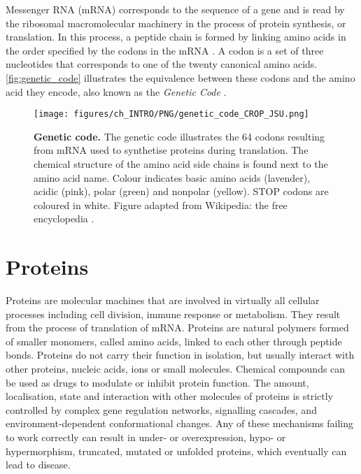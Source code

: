 Messenger RNA (mRNA) corresponds to the sequence of a gene and is read by the ribosomal macromolecular machinery in the process of protein synthesis, or translation. In this process, a peptide chain is formed by linking amino acids in the order specified by the codons in the mRNA \cite{CRICK_1957_CODE}. A codon is a set of three nucleotides that corresponds to one of the twenty canonical amino acids. \autoref{fig:genetic_code} illustrates the equivalence between these codons and the amino acid they encode, also known as the \textit{Genetic Code} \cite{GAMOW_1954_CODE}.

\begin{figure}[htb!]
    \centering
    \texttt{[image: figures/ch\_INTRO/PNG/genetic\_code\_CROP\_JSU.png]}
    \caption[Genetic code]{\textbf{Genetic code.} The genetic code illustrates the 64 codons resulting from mRNA used to synthetise proteins during translation. The chemical structure of the amino acid side chains is found next to the amino acid name. Colour indicates basic amino acids (lavender), acidic (pink), polar (green) and nonpolar (yellow). STOP codons are coloured in white. Figure adapted from Wikipedia: the free encyclopedia \cite{genetic_code_image}.}
    \label{fig:genetic_code}
\end{figure}

\section{Proteins}

Proteins are molecular machines that are involved in virtually all cellular processes including cell division, immune response or metabolism. They result from the process of translation of mRNA. Proteins are natural polymers formed of smaller monomers, called amino acids, linked to each other through peptide bonds. Proteins do not carry their function in isolation, but usually interact with other proteins, nucleic acids, ions or small molecules. Chemical compounds can be used as drugs to modulate or inhibit protein function. The amount, localisation, state and interaction with other molecules of proteins is strictly controlled by complex gene regulation networks, signalling cascades, and environment-dependent conformational changes. Any of these mechanisms failing to work correctly can result in under- or overexpression, hypo- or hypermorphism, truncated, mutated or unfolded proteins, which eventually can lead to disease. %

